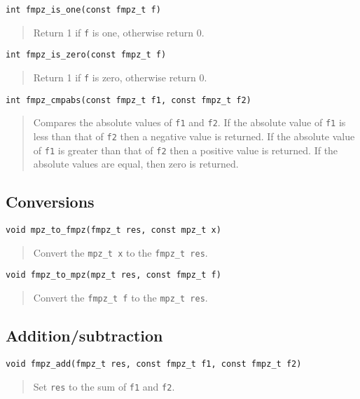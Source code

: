 \documentclass[a4paper,10pt]{article}
\newcommand{\code}{\lstinline}
\begin{document}
\begin{lstlisting}
int fmpz_is_one(const fmpz_t f)
\end{lstlisting}
\begin{quote}
Return 1 if \code{f} is one, otherwise return 0.
\end{quote}

\begin{lstlisting}
int fmpz_is_zero(const fmpz_t f)
\end{lstlisting}
\begin{quote}
Return 1 if \code{f} is zero, otherwise return 0.
\end{quote}

\begin{lstlisting}
int fmpz_cmpabs(const fmpz_t f1, const fmpz_t f2)
\end{lstlisting}
\begin{quote}
Compares the absolute values of \code{f1} and \code{f2}. If the absolute value of \code{f1} is less than that of \code{f2} then a negative value is returned. If the absolute value of \code{f1} is greater than that of \code{f2} then a positive value is returned. If the absolute values are equal, then zero is returned. 
\end{quote}

\subsection{Conversions}

\begin{lstlisting}
void mpz_to_fmpz(fmpz_t res, const mpz_t x)
\end{lstlisting}
\begin{quote}
Convert the \code{mpz_t x} to the \code{fmpz_t res}. 
\end{quote}

\begin{lstlisting}
void fmpz_to_mpz(mpz_t res, const fmpz_t f)
\end{lstlisting}
\begin{quote}
Convert the \code{fmpz_t f} to the \code{mpz_t res}. 
\end{quote}

\subsection{Addition/subtraction}

\begin{lstlisting}
void fmpz_add(fmpz_t res, const fmpz_t f1, const fmpz_t f2)
\end{lstlisting}
\begin{quote}
Set \code{res} to the sum of \code{f1} and \code{f2}.
\end{quote}
\end{document}
